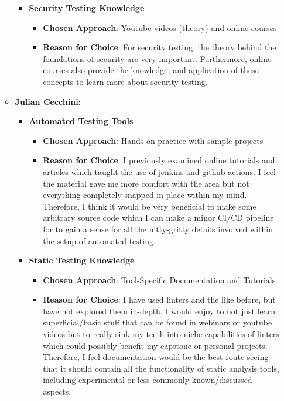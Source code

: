 \documentclass[12pt, titlepage]{article}
\begin{document}
\begin{enumerate}
\begin{itemize}
\begin{itemize}
      \item \textbf{Security Testing Knowledge}  
        \begin{itemize}
            \item \textbf{Chosen Approach}: Youtube videos (theory) and online
            courses
            \item \textbf{Reason for Choice}: For security testing, the theory
            behind the foundations of security are very important. Furthermore,
            online courses also provide the knowledge, and application of these
            concepts to learn more about security testing.
        \end{itemize}
    \end{itemize}
    \item \textbf{Julian Cecchini:} 
    \begin{itemize}
      \item \textbf{Automated Testing Tools}  
      \begin{itemize}
          \item \textbf{Chosen Approach}: Hands-on practice with sample projects
          \item \textbf{Reason for Choice}: I previously examined online tutorials 
          and articles which taught the use of jenkins and github actions. I feel the material
          gave me more comfort with the area but not everything completely snapped in place within
          my mind. Therefore, I think it would be very beneficial to make some arbitrary 
          source code which I can make a minor CI/CD pipeline for to gain a sense for
          all the nitty-gritty details involved within the setup of automated testing.
      \end{itemize}
  
      \item \textbf{Static Testing Knowledge}
      \begin{itemize}
          \item \textbf{Chosen Approach}: Tool-Specific Documentation and Tutorials
          \item \textbf{Reason for Choice}: I have used linters and the like before, but 
          have not explored them in-depth. I would enjoy to not just learn superficial/basic
          stuff that can be found in webinars or youtube videos but to really sink my teeth 
          into niche capabilities of linters which could possibly benefit my capstone or 
          personal projects. Therefore, I feel documentation would be the best route seeing
          that it should contain all the functionality of static analysis tools, including experimental or less commonly known/discussed aspects.
      \end{itemize}
  

\end{itemize}
\end{itemize}
\end{enumerate}
\end{document}
